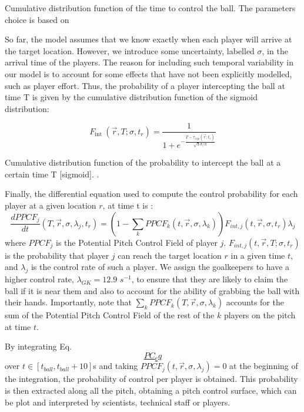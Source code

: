 \documentclass[twoside,nohyper]{tufte-book}
\begin{document}
Cumulative distribution function of the time to control the
ball. The parameters choice is based on {}

So far, the model assumes that we know exactly when each player will
arrive at the target location. However, we introduce some uncertainty,
labelled \(\sigma\), in the arrival time of the players. The reason for
including such temporal variability in our model is to account for some
effects that have not been explicitly modelled, such as player effort.
Thus, the probability of a player intercepting the ball at time T is
given by the cumulative distribution function of the sigmoid
distribution:

\[F_{\text {int }}(\vec{r},T;\sigma, t_r)=\frac{1}{1+e^{-\frac{T- \tau_{exp}(\vec{r} ; t_r)}{\sqrt{3} \sigma / \pi}}}
    \label{sigmoid}\]

Cumulative distribution function of the probability to
intercept the ball at a certain time T {[}sigmoid{]}. {}.

Finally, the differential equation used to compute the control
probability for each player at a given location \(r\), at time t is
\citep{Spearman}:
\[\frac{d P P C F_j}{d t}\left(T, \vec{r} , \sigma, \lambda_j, t_r\right)=\left(1-\sum_k P P C F_k\left(t, \vec{r} , \sigma, \lambda_k\right)\right) F_{int,j}(t, \vec{r}  , \sigma, t_r) \lambda_j
\label{PC_eq}\] where \(PPCF_j\) is the Potential Pitch Control Field of
player \(j\). \(F_{int,j}(t, \vec{r}, T ; \sigma, t_r)\) is the probability
that player \(j\) can reach the target location \(r\) in a given time \(t\),
and \(\lambda_j\) is the control rate of such a player. We assign the
goalkeepers to have a higher control rate, \(\lambda_{GK} = 12.9\)
\(s^{-1}\), to ensure that they are likely to claim the ball if it is near
them and also to account for the ability of grabbing the ball with their
hands. Importantly, note that
\(\sum_k P P C F_k\left(T, \vec{r} , \sigma, \lambda_k\right)\) accounts
for the sum of the Potential Pitch Control Field of the rest of the \(k\)
players on the pitch at time \(t\).

By integrating Eq. \protect\hyperlink{PC_eq}{\[PC_eq\]} over \(t \in \left[ t_{ball},t_{ball} + 10 \right]\)s
and taking \(P P C F_j\left(t, \vec{r} , \sigma, \lambda_j\right) = 0\) at
the beginning of the integration, the probability of control per player
is obtained. This probability is then extracted along all the pitch,
obtaining a pitch control surface, which can be plot and interpreted by
scientists, technical staff or players.
\end{document}
